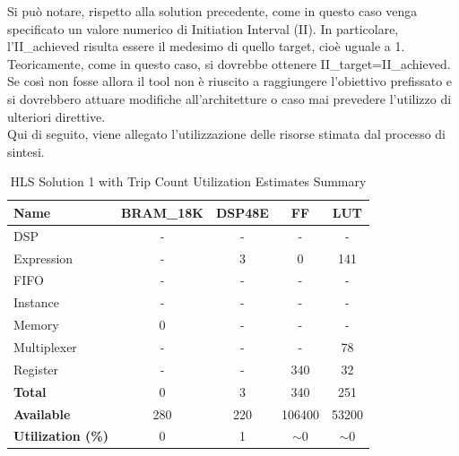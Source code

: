Si può notare, rispetto alla solution precedente, come in questo caso venga specificato un valore numerico di Initiation Interval (II). In particolare, l'II\_achieved risulta essere il medesimo di quello target, cioè uguale a 1. Teoricamente, come in questo caso, si dovrebbe ottenere II\_target=II\_achieved. Se così non fosse allora il tool non è riuscito a raggiungere l'obiettivo prefissato e si dovrebbero attuare modifiche all'architetture o caso mai prevedere l'utilizzo di ulteriori direttive.
\\
Qui di seguito, viene allegato l'utilizzazione delle risorse stimata dal processo di sintesi.
\begin{table}[h]
	\centering
	\begin{tabular}{|l|c|c|c|c|}
		\hline
		\textbf{Name}    & \textbf{BRAM\_18K} & \textbf{DSP48E} & \textbf{FF} & \textbf{LUT} \\ \hline
		DSP              & -                   & -               & -           & -            \\ 
		Expression       & -                   & 3               & 0           & 141          \\ 
		FIFO             & -                   & -               & -           & -            \\ 
		Instance         & -                   & -               & -           & -            \\ 
		Memory           & 0                   & -               & -          & -            \\ 
		Multiplexer      & -                   & -               & -           & 78          \\ 
		Register         & -                   & -               & 340         & 32            \\ \hline
		\textbf{Total}   & 0                   & 3               & 340         & 251          \\ \hline
		\textbf{Available} & 280               & 220             & 106400      & 53200        \\ \hline
		\textbf{Utilization (\%)} & 0            & 1               & $\sim$0     & $\sim$0      \\ \hline
	\end{tabular}
	\caption{HLS Solution 1 with Trip Count Utilization Estimates Summary}
	\label{tab:hls-solution-1-utilization-estimates-summary}
\end{table}

